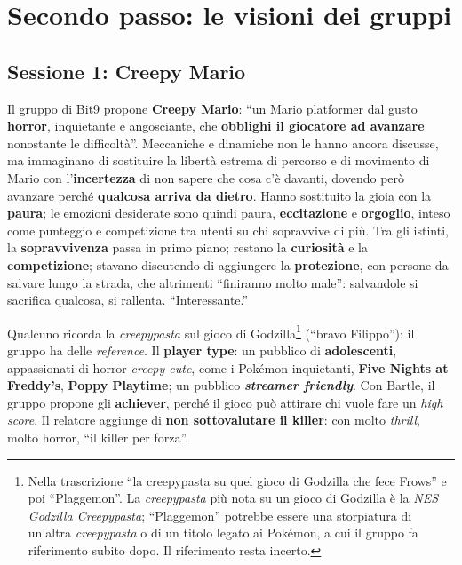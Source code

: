 \section{Secondo passo: le visioni dei gruppi}
\label{z7:sec:visioni-gruppi}

\subsection{Sessione 1: Creepy Mario}

Il gruppo di Bit9 propone \textbf{Creepy Mario}: ``un Mario platformer dal gusto
\textbf{horror}, inquietante e angosciante, che \textbf{obblighi il giocatore ad
avanzare} nonostante le difficoltà''. Meccaniche e dinamiche non le hanno ancora
discusse, ma immaginano di sostituire la libertà estrema di percorso e di
movimento di Mario con l'\textbf{incertezza} di non sapere che cosa c'è davanti,
dovendo però avanzare perché \textbf{qualcosa arriva da dietro}. Hanno sostituito
la gioia con la \textbf{paura}; le emozioni desiderate sono quindi paura,
\textbf{eccitazione} e \textbf{orgoglio}, inteso come punteggio e competizione tra
utenti su chi sopravvive di più. Tra gli istinti, la \textbf{sopravvivenza} passa
in primo piano; restano la \textbf{curiosità} e la \textbf{competizione}; stavano
discutendo di aggiungere la \textbf{protezione}, con persone da salvare lungo la
strada, che altrimenti ``finiranno molto male'': salvandole si sacrifica
qualcosa, si rallenta. ``Interessante.''

Qualcuno ricorda la \emph{creepypasta} sul gioco di Godzilla\footnote{Nella
trascrizione ``la creepypasta su quel gioco di Godzilla che fece Frows'' e poi
``Plaggemon''. La \emph{creepypasta} più nota su un gioco di Godzilla è la
\emph{NES Godzilla Creepypasta}; ``Plaggemon'' potrebbe essere una storpiatura di
un'altra \emph{creepypasta} o di un titolo legato ai Pokémon, a cui il gruppo fa
riferimento subito dopo. Il riferimento resta incerto.} (``bravo Filippo''): il
gruppo ha delle \emph{reference}. Il \textbf{player type}: un pubblico di
\textbf{adolescenti}, appassionati di horror \emph{creepy cute}, come i
Pokémon inquietanti, \textbf{Five Nights at Freddy's}, \textbf{Poppy Playtime}; un
pubblico \textbf{\emph{streamer friendly}}. Con Bartle, il gruppo propone gli
\textbf{achiever}, perché il gioco può attirare chi vuole fare un \emph{high
score}. Il relatore aggiunge di \textbf{non sottovalutare il killer}: con molto
\emph{thrill}, molto horror, ``il killer per forza''.

